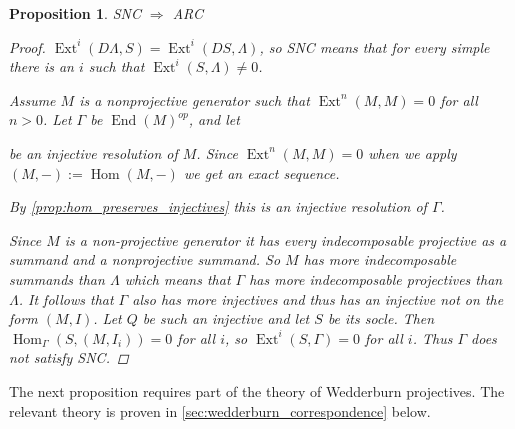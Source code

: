 \documentclass[11pt, a4paper, english]{article}
\newtheorem{prop}[theorem]{Proposition}
\theoremstyle{definition}
\DeclareMathOperator{\Hom}{Hom}
\DeclareMathOperator{\Ext}{Ext}
\DeclareMathOperator{\End}{End}
\begin{document}
\begin{prop}
	SNC $\Rightarrow$ ARC
	\begin{proof}
		$\Ext^i(D\Lambda, S) = \Ext^i(DS, \Lambda)$, so SNC means that for every simple there is an $i$ such that $\Ext^i(S, \Lambda) \neq 0$.
		
		Assume $M$ is a nonprojective generator such that $\Ext^n(M, M)=0$ for all $n>0$. Let $\Gamma$ be $\End(M)^{op}$, and let
		\begin{center}
		\end{center}
		be an injective resolution of $M$. Since $\Ext^n(M,M)=0$ when we apply $(M,-):=\Hom(M,-)$ we get an exact sequence.
		\begin{center}
		\end{center}
		By \cref{prop:hom_preserves_injectives} this is an injective resolution of $\Gamma$.
		
		Since $M$ is a non-projective generator it has every indecomposable projective as a summand and a nonprojective summand. So $M$ has more indecomposable summands than $\Lambda$ which means that $\Gamma$ has more indecomposable projectives than $\Lambda$. It follows that $\Gamma$ also has more injectives and thus has an injective not on the form $(M, I)$. Let $Q$ be such an injective and let $S$ be its socle. Then $\Hom_\Gamma(S, (M, I_i)) = 0$ for all $i$, so $\Ext^i(S, \Gamma) = 0$ for all $i$. Thus $\Gamma$ does not satisfy SNC.
	\end{proof}
\end{prop}

The next proposition requires part of the theory of Wedderburn projectives. The relevant theory is proven in \cref{sec:wedderburn_correspondence} below.
\end{document}
